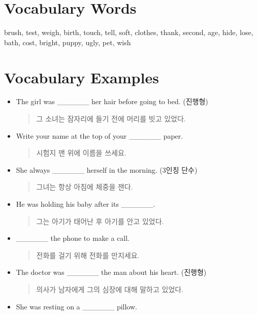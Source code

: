 \documentclass{article}
\begin{document}
\renewcommand{\familydefault}{\sfdefault}
\onehalfspacing
\fontsize{12pt}{14pt}\selectfont

\section*{Vocabulary Words}
\begin{addmargin}[1em]{1em}
brush, test, weigh, birth, touch, tell, soft, clothes, thank, second, age, hide, lose, bath, cost, bright, puppy, ugly, pet, wish
\end{addmargin}

\section*{Vocabulary Examples}
\begin{addmargin}[1em]{1em}
\begin{itemize}
    \item The girl was \_\_\_\_\_\_ her hair before going to bed. (진행형)
    \begin{quote}
    그 소녀는 잠자리에 들기 전에 머리를 빗고 있었다.
    \end{quote}
    \item Write your name at the top of your \_\_\_\_\_\_ paper.
    \begin{quote}
    시험지 맨 위에 이름을 쓰세요.
    \end{quote}
    \item She always \_\_\_\_\_\_ herself in the morning. (3인칭 단수)
    \begin{quote}
    그녀는 항상 아침에 체중을 잰다.
    \end{quote}
    \item He was holding his baby after its \_\_\_\_\_\_.
    \begin{quote}
    그는 아기가 태어난 후 아기를 안고 있었다.
    \end{quote}
    \item \_\_\_\_\_\_ the phone to make a call.
    \begin{quote}
    전화를 걸기 위해 전화를 만지세요.
    \end{quote}
    \item The doctor was \_\_\_\_\_\_ the man about his heart. (진행형)
    \begin{quote}
    의사가 남자에게 그의 심장에 대해 말하고 있었다.
    \end{quote}
    \item She was resting on a \_\_\_\_\_\_ pillow.

\end{itemize}
\end{addmargin}
\end{document}
